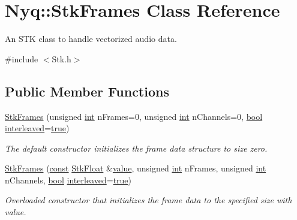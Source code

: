 \hypertarget{class_nyq_1_1_stk_frames}{}\section{Nyq\+:\+:Stk\+Frames Class Reference}
\label{class_nyq_1_1_stk_frames}


An S\+TK class to handle vectorized audio data.  




{\ttfamily \#include $<$Stk.\+h$>$}

\subsection*{Public Member Functions}
\begin{DoxyCompactItemize}
\item 
\hyperlink{class_nyq_1_1_stk_frames_ac7b6741e739dbedffc4b7bd413f510a4}{Stk\+Frames} (unsigned \hyperlink{xmltok_8h_a5a0d4a5641ce434f1d23533f2b2e6653}{int} n\+Frames=0, unsigned \hyperlink{xmltok_8h_a5a0d4a5641ce434f1d23533f2b2e6653}{int} n\+Channels=0, \hyperlink{mac_2config_2i386_2lib-src_2libsoxr_2soxr-config_8h_abb452686968e48b67397da5f97445f5b}{bool} \hyperlink{class_nyq_1_1_stk_frames_ad741aa2fcd3ac59b07e3a497663dfae8}{interleaved}=\hyperlink{mac_2config_2i386_2lib-src_2libsoxr_2soxr-config_8h_a41f9c5fb8b08eb5dc3edce4dcb37fee7}{true})
\begin{DoxyCompactList}\small\item\em The default constructor initializes the frame data structure to size zero. \end{DoxyCompactList}\item 
\hyperlink{class_nyq_1_1_stk_frames_a0e660bdd417c9606fc4bbbefe4b73800}{Stk\+Frames} (\hyperlink{getopt1_8c_a2c212835823e3c54a8ab6d95c652660e}{const} \hyperlink{namespace_nyq_a044fa20a706520a617bbbf458a7db7e4}{Stk\+Float} \&\hyperlink{lib_2expat_8h_a4a30a13b813682e68c5b689b45c65971}{value}, unsigned \hyperlink{xmltok_8h_a5a0d4a5641ce434f1d23533f2b2e6653}{int} n\+Frames, unsigned \hyperlink{xmltok_8h_a5a0d4a5641ce434f1d23533f2b2e6653}{int} n\+Channels, \hyperlink{mac_2config_2i386_2lib-src_2libsoxr_2soxr-config_8h_abb452686968e48b67397da5f97445f5b}{bool} \hyperlink{class_nyq_1_1_stk_frames_ad741aa2fcd3ac59b07e3a497663dfae8}{interleaved}=\hyperlink{mac_2config_2i386_2lib-src_2libsoxr_2soxr-config_8h_a41f9c5fb8b08eb5dc3edce4dcb37fee7}{true})
\begin{DoxyCompactList}\small\item\em Overloaded constructor that initializes the frame data to the specified size with {\ttfamily value}. \end{DoxyCompactList}\item 

\end{DoxyCompactItemize}
